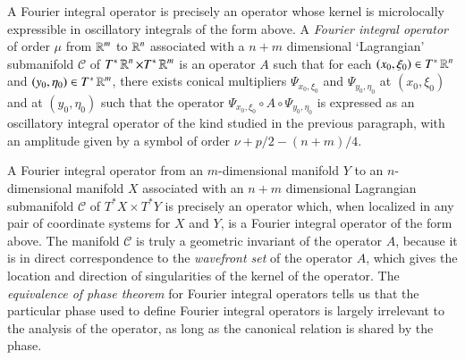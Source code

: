 %
%
%
%

A Fourier integral operator is precisely an operator whose kernel is microlocally expressible in oscillatory integrals of the form above. A \emph{Fourier integral operator} of order $\mu$ from $\operatorname{\mathbb{R}}^m$ to $\operatorname{\mathbb{R}}^n$ associated with a $n + m$ dimensional `Lagrangian' submanifold $\mathcal{C}$ of $T^* \operatorname{\mathbb{R}}^n \times T^* \operatorname{\mathbb{R}}^m$ is an operator $A$ such that for each $(x_0,\xi_0) \in T^* \operatorname{\mathbb{R}}^n$ and $(y_0,\eta_0) \in T^* \operatorname{\mathbb{R}}^m$, there exists conical multipliers $\Psi_{x_0,\xi_0}$ and $\Psi_{y_0,\eta_0}$ at $(x_0,\xi_0)$ and at $(y_0,\eta_0)$ such that the operator $\Psi_{x_0,\xi_0} \circ A \circ \Psi_{y_0,\eta_0}$ is expressed as an oscillatory integral operator of the kind studied in the previous paragraph, with an amplitude given by a symbol of order $\nu + p/2 - (n+m)/4$.

A Fourier integral operator from an $m$-dimensional manifold $Y$ to an $n$-dimensional manifold $X$ associated with an $n + m$ dimensional Lagrangian submanifold $\mathcal{C}$ of $T^* X \times T^* Y$ is precisely an operator which, when localized in any pair of coordinate systems for $X$ and $Y$, is a Fourier integral operator of the form above. The manifold $\mathcal{C}$ is truly a geometric invariant of the operator $A$, because it is in direct correspondence to the \emph{wavefront set} of the operator $A$, which gives the location and direction of singularities of the kernel of the operator. The \emph{equivalence of phase theorem} for Fourier integral operators tells us that the particular phase used to define Fourier integral operators is largely irrelevant to the analysis of the operator, as long as the canonical relation is shared by the phase.

